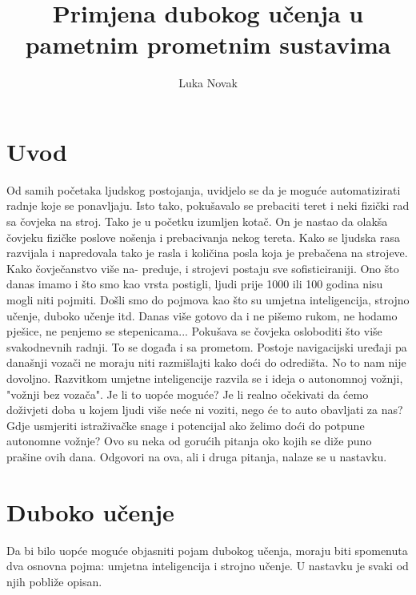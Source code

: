 \documentclass[seminar, utf8, numeric]{fer}
\begin{document}
\title{Primjena dubokog učenja u pametnim prometnim sustavima}

\author{Luka Novak}


\maketitle

\tableofcontents

\chapter{Uvod}
Od samih početaka ljudskog postojanja, uvidjelo se da je moguće automatizirati radnje koje se ponavljaju. Isto tako, pokušavalo se prebaciti teret i neki fizički rad sa čovjeka na stroj. Tako je u početku izumljen kotač. On je nastao da olakša čovjeku fizičke poslove nošenja i prebacivanja nekog tereta. Kako se ljudska rasa razvijala i napredovala tako je rasla i količina posla koja je prebačena na strojeve. Kako čovječanstvo više na-
preduje, i strojevi postaju sve sofisticiraniji. Ono što danas imamo i što smo kao vrsta postigli, ljudi prije 1000 ili 100 godina nisu mogli niti pojmiti. Došli smo do pojmova kao što su umjetna inteligencija, strojno učenje, duboko učenje itd. Danas više gotovo da i ne pišemo rukom, ne hodamo pješice, ne penjemo se stepenicama... Pokušava se čovjeka osloboditi što više svakodnevnih radnji. To se događa i sa prometom. Postoje navigacijski uređaji pa današnji vozači ne moraju niti razmišlajti kako doći do odredišta. No to nam nije dovoljno. Razvitkom umjetne inteligencije razvila se i ideja o
autonomnoj vožnji, "vožnji bez vozača". Je li to uopće moguće? Je li realno očekivati da ćemo doživjeti doba u kojem ljudi više neće ni voziti, nego će to auto obavljati za nas? Gdje usmjeriti istraživačke snage i potencijal ako želimo doći do potpune autonomne vožnje? Ovo su neka od gorućih pitanja oko kojih se diže puno prašine ovih dana. Odgovori na ova, ali i druga pitanja, nalaze se u nastavku.

\chapter{Duboko učenje}
Da bi bilo uopće moguće objasniti pojam dubokog učenja, moraju biti spomenuta dva osnovna pojma: umjetna inteligencija i strojno učenje. U nastavku je svaki od njih pobliže opisan.
\end{document}

